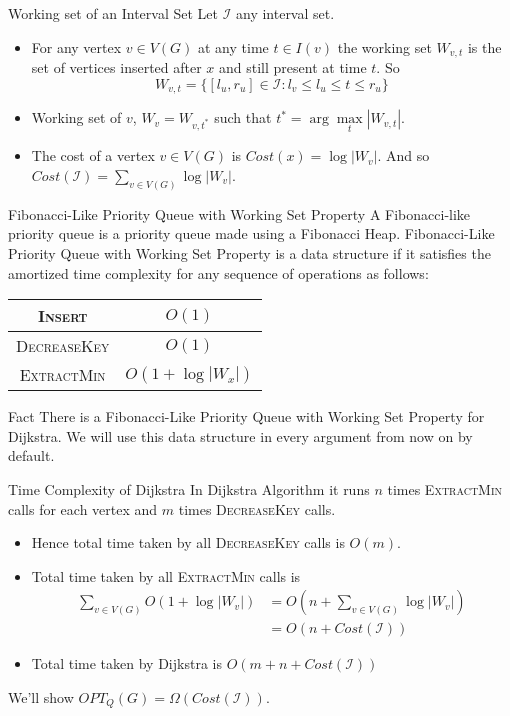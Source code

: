 \documentclass[10pt]{beamer}
\begin{document}
\begin{frame}{Working set of an Interval Set}
	Let $\mathcal{I}$ any interval set.\pause

	\begin{itemize}
		\item For any vertex $v\in V(G)$ at any time $t\in I(v)$ the working set $W_{v,t}$ is the set of vertices inserted after $x$ and still present at time $t$. So $$W_{v,t}=\{[l_u,r_u]\in\mathcal{I}\colon l_v\leq l_u\leq t\leq r_u\}$$\pause \vfill
		\item Working set of $v$, $W_v=W_{v,t^*}$ such that $t^*=\arg\max\limits_t|W_{v,t}|$.\pause  \vfill
		\item The cost of a vertex $v\in V(G)$ is $Cost(x)=\log|W_v|$. And so $Cost(\mathcal{I})=\sum\limits_{v\in V(G)} \log |W_v|$.
	\end{itemize}
\end{frame}
\begin{frame}{Fibonacci-Like Priority Queue with Working Set Property}
	A Fibonacci-like priority queue is a priority queue made using a Fibonacci Heap. Fibonacci-Like Priority Queue with Working Set Property is a data structure if it satisfies the amortized time complexity for any sequence of operations as follows:\pause

	\begin{center}
		\begin{tabular}{|c|c|}
			\hline
			\textsc{Insert}      & $O(1)$           \\  \hline
			\textsc{DecreaseKey} & $O(1)$           \\ \hline
			\textsc{ExtractMin}  & $O(1+\log|W_x|)$ \\ \hline
		\end{tabular}
	\end{center}\pause \vfill


	\begin{alertblock}{Fact}
		There is a Fibonacci-Like Priority Queue with Working Set Property for Dijkstra. We will use this data structure in every argument from now on by default.
	\end{alertblock}
\end{frame}
\begin{frame}{Time Complexity of Dijkstra}
	In Dijkstra Algorithm it runs $n$ times \textsc{ExtractMin} calls for each vertex and $m$ times \textsc{DecreaseKey} calls.\pause
	\begin{itemize}
		\item Hence total time taken by all \textsc{DecreaseKey} calls is $O(m)$.\pause
		\item Total time taken by all \textsc{ExtractMin} calls is \begin{align*}
			      \sum\limits_{v\in V(G)}O(1+\log|W_v|) & = O\left(n+\sum\limits_{v\in V(G)} \log |W_v| \right) \\
			                                            & = O(n+Cost(\mathcal{I}))
		      \end{align*}
		\item Total time taken by Dijkstra is $O(m+n+Cost(\mathcal{I}))$
	\end{itemize}\pause
	We'll show $OPT_Q(G)=\Omega(Cost(\mathcal{I}))$.
\end{frame}
\end{document}
